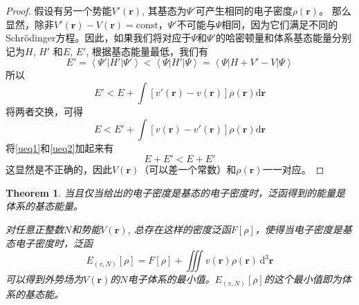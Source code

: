 \documentclass[12pt,a4paper,openany,twoside]{book}
\newtheorem{theorem}{Theorem}[section]
\numberwithin{equation}{section}
\newcommand{\bracketl}[3]{\left\langle #1 \left| #2 \right| #3 \right\rangle}
\newcommand{\sch}{Schr\"odinger}
\newcommand{\ud}{\mathrm{d}}
\begin{document}
\begin{description}
\begin{description}
\begin{proof}
                  假设有另一个势能$V'(\textbf{r})$, 其基态为$\Psi'$可产生相同的电子密度$\rho(\textbf{r})$。 那么显然，除非$V'(\textbf{r})-V(\textbf{r})=\mathrm{const}$，$\Psi'$不可能与$\Psi$相同，因为它们满足不同的\sch 方程。因此，如果我们将对应于$\Psi$和$\Psi'$的哈密顿量和体系基态能量分别记为$H$, $H'$ 和$E$, $E'$, 根据基态能量最低，我们有
                  \begin{equation}
                    E'=\bracketl{\Psi'}{H'}{\Psi'}<\bracketl{\Psi}{H'}{\Psi}=\bracketl{\Psi}{H+V'-V}{\Psi}
                  \end{equation}
                  所以
                  \begin{equation}
                    E'<E+\int [v'(\textbf{r})-v(\textbf{r})]\rho(\textbf{r})\ud\textbf{r}
                    \label{ueq1}
                  \end{equation}
                  将两者交换，可得
                  \begin{equation}
                    E<E'+\int [v(\textbf{r})-v'(\textbf{r})]\rho(\textbf{r})\ud\textbf{r}
                    \label{ueq2}
                  \end{equation}
                  将\ref{ueq1}和\ref{ueq2}加起来有
                  \begin{equation}
                    E+E'<E+E'
                  \end{equation}
                  这显然是不正确的，因此$V(\textbf{r})$（可以差一个常数）和$\rho(\textbf{r})$一一对应。
                \end{proof}
            
                \begin{theorem}
                  当且仅当给出的电子密度是基态的电子密度时，泛函得到的能量是体系的基态能量。
                  
                  对任意正整数$N$和势能$V(\textbf{r})$, 总存在这样的密度泛函$F[\rho]$，使得当电子密度是基态电子密度时，泛函
                  \begin{equation}
                    E_{(v,N)}[\rho]=F[\rho]+\iiint v(\textbf{r})\rho(\textbf{r})\,\ud^3\textbf{r}
                  \end{equation}
                  可以得到外势场为$V(\textbf{r})$的$N$电子体系的最小值。$E_{(v,N)}[\rho]$的这个最小值即为体系的基态能。
                \end{theorem}
            

\end{description}
\end{description}
\end{document}
